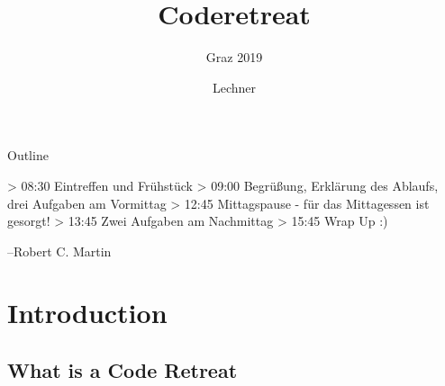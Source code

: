 \documentclass[12pt, xcolor=table, dvipsnames]{beamer}
\begin{document}
\author[Lechner]{Lechner} %
\title{Coderetreat }
\subtitle{Graz 2019}
%
\frame[plain]{\maketitle}

\begin{frame}[squeeze]{Outline}
\small
\tableofcontents
\end{frame}



> 08:30 Eintreffen und Frühstück
> 09:00 Begrüßung, Erklärung des Ablaufs, drei Aufgaben am Vormittag
> 12:45 Mittagspause - für das Mittagessen ist gesorgt!
> 13:45 Zwei Aufgaben am Nachmittag
> 15:45 Wrap Up :)


\begin{frame}[plain]
\begin{center}
    \textit{\color{blue}{\large
            Writing clean code is what you must do in order to call yourself a professional.\\
            There is no reasonable excuse for doing anything less than your best.}}
\end{center}

\flushright--Robert C. Martin
\end{frame}

\section{Introduction}
\subsection{What is a Code Retreat}
\begin{frame}[squeeze]{\subsecname{}}

\end{frame}
\end{document}
